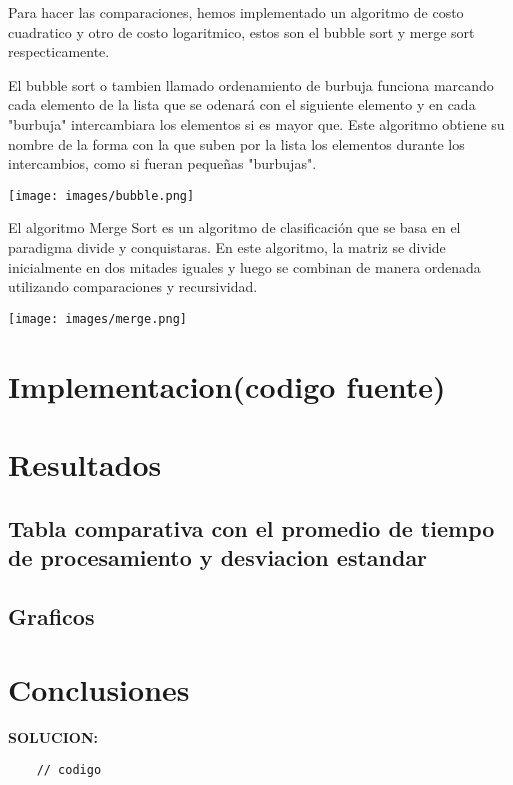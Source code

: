 Para hacer las comparaciones, hemos implementado un algoritmo de costo cuadratico y otro de costo logaritmico, estos son el bubble sort y merge sort respecticamente.

El bubble sort o tambien llamado ordenamiento de burbuja funciona marcando cada elemento de la lista que se odenará con el siguiente elemento y en cada "burbuja" intercambiara los elementos si es mayor que. Este algoritmo obtiene su nombre de la forma con la que suben por la lista los elementos durante los intercambios, como si fueran pequeñas "burbujas".

\texttt{[image: images/bubble.png]}

El algoritmo Merge Sort es un algoritmo de clasificación que se basa en el paradigma divide y conquistaras. En este algoritmo, la matriz se divide inicialmente en dos mitades iguales y luego se combinan de manera ordenada utilizando comparaciones y recursividad.

\texttt{[image: images/merge.png]}
\section{Implementacion(codigo fuente)}
\section{Resultados}
\subsection{Tabla comparativa con el promedio de tiempo de procesamiento y desviacion estandar}
\subsection{Graficos}
\section{Conclusiones}

\textbf{SOLUCION:}
\begin{verbatim}
    // codigo
\end{verbatim}